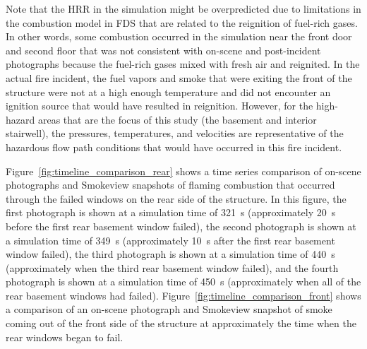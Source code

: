 \documentclass[12pt,oneside]{book}
\begin{document}
Note that the HRR in the simulation might be overpredicted due to limitations in the combustion model in FDS that are related to the reignition of fuel-rich gases. In other words, some combustion occurred in the simulation near the front door and second floor that was not consistent with on-scene and post-incident photographs because the fuel-rich gases mixed with fresh air and reignited. In the actual fire incident, the fuel vapors and smoke that were exiting the front of the structure were not at a high enough temperature and did not encounter an ignition source that would have resulted in reignition. However, for the high-hazard areas that are the focus of this study (the basement and interior stairwell), the pressures, temperatures, and velocities are representative of the hazardous flow path conditions that would have occurred in this fire incident.

Figure~\ref{fig:timeline_comparison_rear} shows a time series comparison of on-scene photographs and Smokeview snapshots of flaming combustion that occurred through the failed windows on the rear side of the structure. In this figure, the first photograph is shown at a simulation time of 321~s (approximately 20~s before the first rear basement window failed), the second photograph is shown at a simulation time of 349~s (approximately 10~s after the first rear basement window failed), the third photograph is shown at a simulation time of 440~s (approximately when the third rear basement window failed), and the fourth photograph is shown at a simulation time of 450~s (approximately when all of the rear basement windows had failed). Figure~\ref{fig:timeline_comparison_front} shows a comparison of an on-scene photograph and Smokeview snapshot of smoke coming out of the front side of the structure at approximately the time when the rear windows began to fail.
\end{document}
